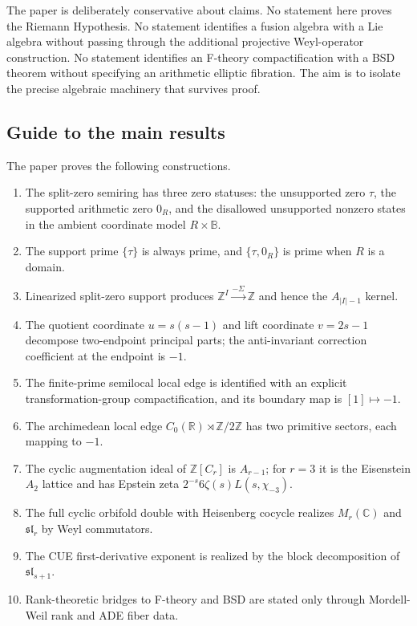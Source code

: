 \documentclass[11pt]{amsart}
\newcommand{\ZZ}{\mathbb Z}
\newcommand{\RR}{\mathbb R}
\newcommand{\CC}{\mathbb C}
\newcommand{\BB}{\mathbb B}
\newcommand{\tauz}{\tau}
\begin{document}
The paper is deliberately conservative about claims.  No statement here proves the Riemann Hypothesis.  No statement identifies a fusion algebra with a Lie algebra without passing through the additional projective Weyl-operator construction.  No statement identifies an F-theory compactification with a BSD theorem without specifying an arithmetic elliptic fibration.  The aim is to isolate the precise algebraic machinery that survives proof.

\subsection*{Guide to the main results}

The paper proves the following constructions.
\begin{enumerate}[label=(\roman*)]
\item The split-zero semiring has three zero statuses: the unsupported zero $\tauz$, the supported arithmetic zero $0_R$, and the disallowed unsupported nonzero states in the ambient coordinate model $R\times\BB$.
\item The support prime $\{\tauz\}$ is always prime, and $\{\tauz,0_R\}$ is prime when $R$ is a domain.
\item Linearized split-zero support produces $\ZZ^I\xrightarrow{-\Sigma}\ZZ$ and hence the $A_{|I|-1}$ kernel.
\item The quotient coordinate $u=s(s-1)$ and lift coordinate $v=2s-1$ decompose two-endpoint principal parts; the anti-invariant correction coefficient at the endpoint is $-1$.
\item The finite-prime semilocal local edge is identified with an explicit transformation-group compactification, and its boundary map is $[1]\mapsto -1$.
\item The archimedean local edge $C_0(\RR)\rtimes\ZZ/2\ZZ$ has two primitive sectors, each mapping to $-1$.
\item The cyclic augmentation ideal of $\ZZ[C_r]$ is $A_{r-1}$; for $r=3$ it is the Eisenstein $A_2$ lattice and has Epstein zeta $2^{-s}6\zeta(s)L(s,\chi_{-3})$.
\item The full cyclic orbifold double with Heisenberg cocycle realizes $M_r(\CC)$ and $\mathfrak{sl}_r$ by Weyl commutators.
\item The CUE first-derivative exponent is realized by the block decomposition of $\mathfrak{sl}_{s+1}$.
\item Rank-theoretic bridges to F-theory and BSD are stated only through Mordell-Weil rank and ADE fiber data.
\end{enumerate}
\end{document}
